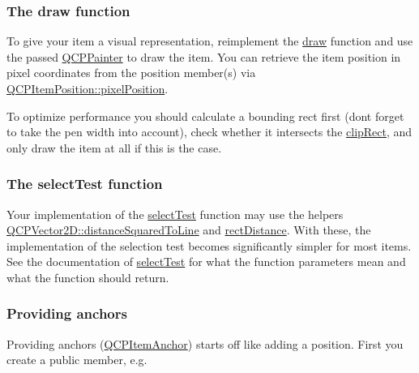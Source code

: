 \begin{DoxyCode}{0}
\DoxyCodeLine{\{}
\DoxyCodeLine{  \textcolor{comment}{// other constructor code}}
\DoxyCodeLine{\}}
\end{DoxyCode}
\hypertarget{class_q_c_p_abstract_item_items-drawing}{}\subsubsection{The draw function}\label{class_q_c_p_abstract_item_items-drawing}
To give your item a visual representation, reimplement the \mbox{\hyperlink{class_q_c_p_abstract_item_a007fdab79c935a5da5aa04a21d268c18}{draw}} function and use the passed \mbox{\hyperlink{class_q_c_p_painter}{Q\+C\+P\+Painter}} to draw the item. You can retrieve the item position in pixel coordinates from the position member(s) via \mbox{\hyperlink{class_q_c_p_item_position_a8be9a4787635433edecc75164beb748d}{Q\+C\+P\+Item\+Position\+::pixel\+Position}}.

To optimize performance you should calculate a bounding rect first (don\textquotesingle{}t forget to take the pen width into account), check whether it intersects the \mbox{\hyperlink{class_q_c_p_abstract_item_a6ad60000f29afe11035e1f791dcbd45a}{clip\+Rect}}, and only draw the item at all if this is the case.\hypertarget{class_q_c_p_abstract_item_items-selection}{}\subsubsection{The select\+Test function}\label{class_q_c_p_abstract_item_items-selection}
Your implementation of the \mbox{\hyperlink{class_q_c_p_abstract_item_ae41d0349d68bb802c49104afd100ba2a}{select\+Test}} function may use the helpers \mbox{\hyperlink{class_q_c_p_vector2_d_a14840cd3da80cfee4eb3f8977cab89ab}{Q\+C\+P\+Vector2\+D\+::distance\+Squared\+To\+Line}} and \mbox{\hyperlink{class_q_c_p_abstract_item_a7dfc2007e36d09b8b5c988a9f06d6a7e}{rect\+Distance}}. With these, the implementation of the selection test becomes significantly simpler for most items. See the documentation of \mbox{\hyperlink{class_q_c_p_abstract_item_ae41d0349d68bb802c49104afd100ba2a}{select\+Test}} for what the function parameters mean and what the function should return.\hypertarget{class_q_c_p_abstract_item_anchors}{}\subsubsection{Providing anchors}\label{class_q_c_p_abstract_item_anchors}
Providing anchors (\mbox{\hyperlink{class_q_c_p_item_anchor}{Q\+C\+P\+Item\+Anchor}}) starts off like adding a position. First you create a public member, e.\+g.


